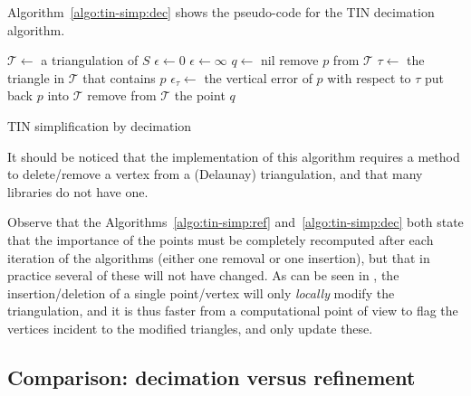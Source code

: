Algorithm~\ref{algo:tin-simp:dec} shows the pseudo-code for the TIN decimation algorithm.
\begin{algorithm}[tb] 
	$\mathcal{T} \leftarrow$ a triangulation of $S$ \;
	$\epsilon \leftarrow 0$ \;
	\While{$\epsilon < \epsilon_{\max}$}
	{
		$\epsilon \leftarrow \infty$  \;
		$q \leftarrow$ nil \;
		{
			remove $p$ from $\mathcal{T}$ \;
			$\tau \leftarrow$ the triangle in $\mathcal{T}$ that contains $p$ \;
			$\epsilon_{\tau} \leftarrow$ the vertical error of $p$ with respect to $\tau$ \;
			put back $p$ into $\mathcal{T}$ \;
		}
		remove from $\mathcal{T}$ the point $q$ \;
	}
	\caption{TIN simplification by decimation}%
\label{algo:tin-simp:dec}
\end{algorithm}
It should be noticed that the implementation of this algorithm requires a method to delete/remove a vertex from a (Delaunay) triangulation, and that many libraries do not have one.

Observe that the Algorithms~\ref{algo:tin-simp:ref} and~\ref{algo:tin-simp:dec} both state that the importance of the points must be completely recomputed after each iteration of the algorithms (either one removal or one insertion), but that in practice several of these will not have changed.
As can be seen in , the insertion/deletion of a single point/vertex will only \emph{locally} modify the triangulation, and it is thus faster from a computational point of view to flag the vertices incident to the modified triangles, and only update these.


%
\subsection{Comparison: decimation versus refinement}

